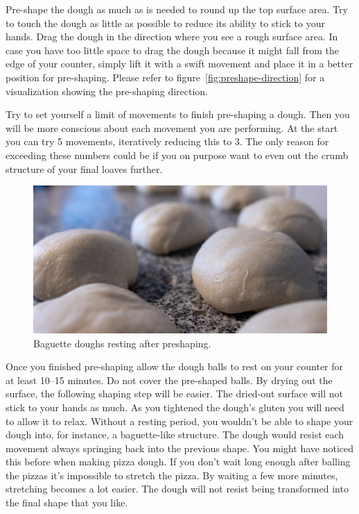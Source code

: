Pre-shape the dough as much as is needed to round up the top
surface area. Try to touch the dough as little as possible
to reduce its ability to stick to your hands. Drag the dough
in the direction where you see a rough surface area. In
case you have too little space to drag the dough because it might
fall from the edge of your counter, simply lift it with a swift movement and place
it in a better position for pre-shaping. Please refer to figure~\ref{fig:preshape-direction}
for a visualization showing the pre-shaping direction.

Try to set yourself a limit of movements to finish pre-shaping
a dough. Then you will be more conscious about each movement
you are performing. At the start you can try 5 movements,
iteratively reducing this to 3. The only reason for exceeding these
numbers could be if you on purpose want to even out the crumb
structure of your final loaves further.

\begin{figure}[!htb]
  \includegraphics[width=\textwidth]{preshaped-dough}
  \caption{Baguette doughs resting after preshaping.}%
  \label{fig:dough-after-preshaping}
\end{figure}

Once you finished pre-shaping allow the dough balls to rest
on your counter for at least 10--15 minutes. Do not
cover the pre-shaped balls. By drying out the surface,
the following shaping step will be easier. The dried-out surface
will not stick to your hands as much. As
you tightened the dough's gluten you will need to
allow it to relax. Without a resting period, you wouldn't
be able to shape your dough into, for instance, a baguette-like structure.
The dough would resist each movement
always springing back into the previous shape. You
might have noticed this before when making pizza dough. If you
don't wait long enough after balling the pizzas it's impossible
to stretch the pizza. By waiting a few more minutes,
stretching becomes a lot easier. The dough will not resist
being transformed into the final shape that you like.

